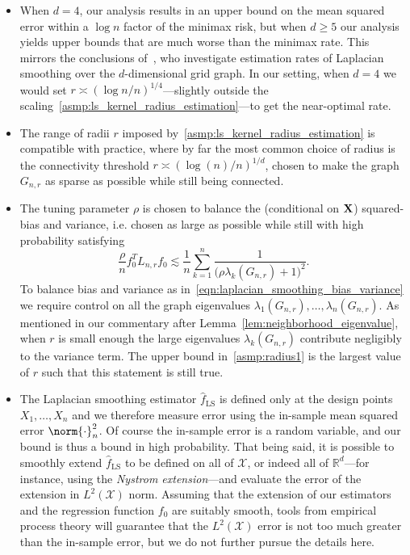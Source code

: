 \documentclass[twoside]{article}
\newcommand{\Reals}{\mathbb{R}}
\newcommand{\1}{\mathbf{1}}
\newcommand{\Lap}{L}
\newcommand{\Xset}{\mathcal{X}}
\newcommand{\Leb}{L}
\newcommand{\wh}[1]{\widehat{#1}}
\newcommand{\LS}{\mathrm{LS}}
\theoremstyle{definition}
\theoremstyle{remark}
\begin{document}
\begin{itemize}
	\item When $d = 4$, our analysis results in an upper bound on the mean squared error within a $\log n$ factor of the minimax risk, but when $d \geq 5$ our analysis yields upper bounds that are much worse than the minimax rate. This mirrors the conclusions of~\cite{sadhanala16}, who investigate estimation rates of Laplacian smoothing over the $d$-dimensional grid graph. In our setting, when $d = 4$ we would set $r \asymp (\log n/n)^{1/4}$---slightly outside the scaling~\ref{asmp:ls_kernel_radius_estimation}---to get the near-optimal rate.
	\item The range of radii $r$ imposed by~\ref{asmp:ls_kernel_radius_estimation} is  compatible with practice, where by far the most common choice of radius is the connectivity threshold $r \asymp (\log(n)/n)^{1/d}$, chosen to make the graph $G_{n,r}$ as sparse as possible while still being connected. 
	\item The tuning parameter $\rho$ is chosen to balance the (conditional on ${\bf X}$) squared-bias and variance, i.e. chosen as large as possible while still with high probability satisfying
	\begin{equation}
	\label{eqn:laplacian_smoothing_bias_variance}
	\frac{\rho}{n} f_0^T \Lap_{{n,r}} f_0 \lesssim \frac{1}{n}\sum_{k = 1}^{n} \frac{1}{\bigl(\rho \lambda_{k}(G_{n,r}) + 1\bigr)^2}.
	\end{equation}
	To balance bias and variance as in~\eqref{eqn:laplacian_smoothing_bias_variance} we require control on all the graph eigenvalues $\lambda_1(G_{n,r}),\ldots,\lambda_n(G_{n,r})$. As mentioned in our commentary after Lemma~\ref{lem:neighborhood_eigenvalue}, when $r$ is small enough the large eigenvalues $\lambda_k(G_{n,r})$ contribute negligibly to the variance term. The upper bound in~\ref{asmp:radius1} is the largest value of $r$ such that this statement is still true.
	\item The Laplacian smoothing estimator $\wh{f}_{\LS}$ is defined only at the design points $X_1,\ldots,X_n$ and we therefore measure error using the in-sample mean squared error $\norm{\cdot}_n^2$. Of course the in-sample error is a random variable, and our bound is thus a bound in high probability. That being said, it is possible to smoothly extend $\wh{f}_{\LS}$ to be defined on all of $\Xset$, or indeed all of $\Reals^d$---for instance, using the \emph{Nystrom extension}---and evaluate the error of the extension in $\Leb^2(\Xset)$ norm. Assuming that the extension of our estimators and the regression function $f_0$ are suitably smooth, tools from empirical process theory will guarantee that the $\Leb^2(\Xset)$ error is not too much greater than the in-sample error, but we do not further pursue the details here.
\end{itemize}
\end{document}
